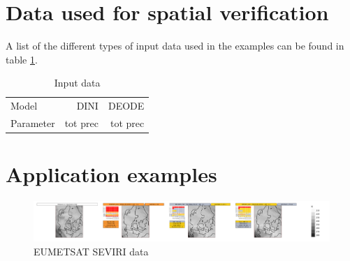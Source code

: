 \documentclass[11pt,a4paper]{article}
\begin{document}
\section{Data used for spatial verification}



A list of the different types of input data used in the examples can be found in table \ref{tab:grib}. %

\begin{table}
{\center\it\caption{ \label{tab:grib} Input data}}
\begin{center}
\begin{tabular}{lrr}
 Model                                       & DINI & DEODE \\
 Parameter    &   tot prec & tot prec \\
\end{tabular}
\end{center}
\end{table} 

\section{Application examples}



\begin{figure}[htbp]
    \centering
    \includegraphics[width=1.2\textwidth]{../PLOTS/panel_IR_108_202401022300+23}
    \caption{EUMETSAT SEVIRI data}
    \label{fig:IRexample}
\end{figure}
\end{document}
